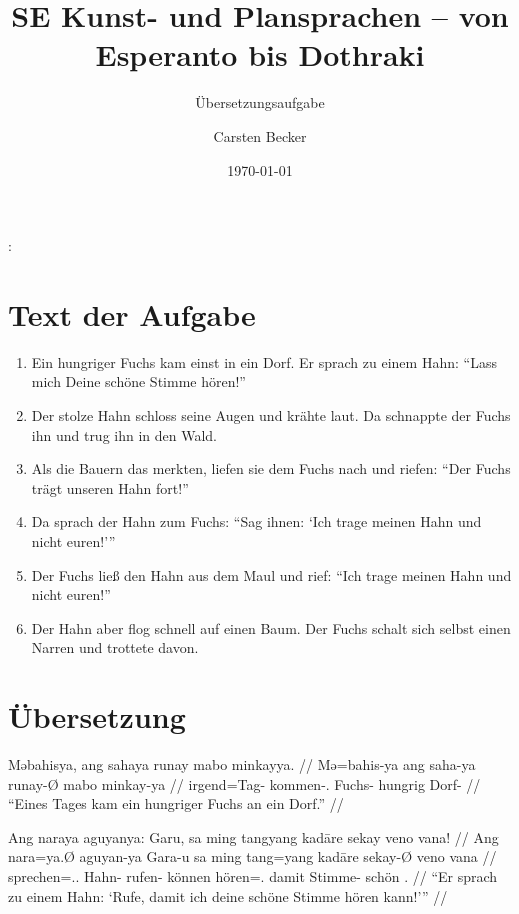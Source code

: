 \documentclass[12pt,paper=a4]{scrartcl}
\author{Carsten Becker}
\title{SE Kunst- und Plansprachen -- von Esperanto bis Dothraki}
\subtitle{Übersetzungsaufgabe}
\date{\today} %
\newcommand{\TsgM}{{\Tsg}.{\M}}
\newenvironment{mytitle}{
    \hfill
    \begin{minipage}{0.667\textwidth}
	\vspace{\baselineskip}
	\begin{center}
	    \Large
	    \sffamily\bfseries
	    \makeatletter
}{
	    \makeatother
	\end{center}
	\vspace{1em}
    \end{minipage}
    \hfill
}
\begin{document}

\begin{mytitle}
    \@title: \@subtitle\footnotemark
\end{mytitle}

\section{Text der Aufgabe}

\begin{enumerate}[noitemsep]
\item Ein hungriger Fuchs kam einst in ein Dorf. Er sprach zu einem Hahn: \enquote{Lass mich Deine schöne Stimme hören!}
\item Der stolze Hahn schloss seine Augen und krähte laut. Da schnappte der Fuchs ihn und trug ihn in den Wald.
\item Als die Bauern das merkten, liefen sie dem Fuchs nach und riefen: \enquote{Der Fuchs trägt unseren Hahn fort!}
\item Da sprach der Hahn zum Fuchs: \enquote{Sag ihnen: \enquote{Ich trage meinen Hahn und nicht euren!}}
\item Der Fuchs ließ den Hahn aus dem Maul und rief: \enquote{Ich trage meinen Hahn und nicht euren!}
\item Der Hahn aber flog schnell auf einen Baum. Der Fuchs schalt sich selbst einen Narren und trottete davon.
\end{enumerate}

\section{Übersetzung}

\pex %
\a\begingl
	\gla Məbahisya, ang sahaya runay mabo minkayya. //
	\glb Mə=bahis-ya ang saha-ya runay-Ø mabo minkay-ya //
	\glc irgend=Tag-\Loc{} \AgtT{} kommen-\TsgM{} Fuchs-\Top{} hungrig Dorf-\Loc{} //
	\glft \enquote{Eines Tages kam ein hungriger Fuchs an ein Dorf.} //
\endgl

\a\label{ex:umformuliert}\begingl[glspace=0.25em]
	\gla Ang naraya aguyanya: Garu, sa ming tangyang kadāre sekay veno vana! //
	\glb Ang nara=ya.Ø aguyan-ya Gara-u sa ming tang=yang kadāre sekay-Ø veno vana //
	\glc \AgtT{} sprechen=\TsgM{}.\Top{} Hahn-\Loc{} rufen-\Imp{} \PatT{} können hören=\Fsg{}.\Aarg{} damit Stimme-\Top{} schön \Ssg{}.\Gen{} //
	\glft \enquote{Er sprach zu einem Hahn: \enquote{Rufe, damit ich deine schöne Stimme hören kann!}} //
\endgl
\end{document}
